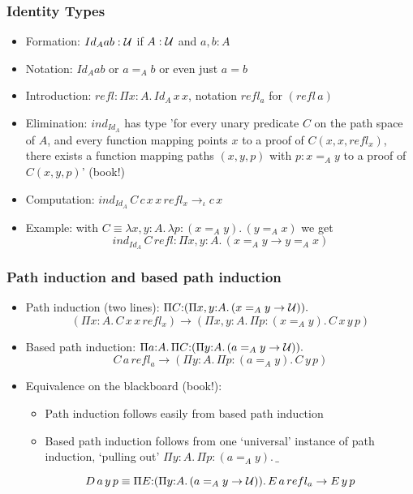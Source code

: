 \documentclass[handout]{beamer}
\newcommand{\depi}[3]{\Pi{#1{:}#2.\,#3}}
\newcommand{\lamt}[3]{\lambda{#1{:}#2.\,#3}}
\newcommand{\UU}{{\cal U}}
\begin{document}
\frame
  {
  
    \frametitle{Identity Types}

    \begin{itemize}[<+->]
    \item Formation: $Id_A a b:\UU$ if $A:\UU$ and $a,b:A$
    \item Notation: $Id_A a b$ or $a=_A b$ or even just $a=b$
    \item Introduction: $refl: \depi{x}{A}{Id_A\,x\,x}$, notation $refl_a$ for $(refl \,a)$
    \item Elimination: $ind_{Id_A}$ has type 'for every unary predicate $C$ on the path space of $A$,
and every function mapping points $x$ to a proof of $C(x,x,refl_x)$, there exists a function mapping paths
$(x,y,p)$ with $p:x=_A y$ to a proof of $C(x,y,p)$' (book!) 
    \item Computation: $ind_{Id_A}\,C\,c\,x\,x\,refl_x \to_\iota c\,x$
    \item Example: with $C\equiv\lamt{x,y}{A}{\lamt{p}{(x{=_A}y)}{(y =_A x)}}$ we get
$$ind_{Id_A}\,C\,refl: \depi{x,y}{A}{(x =_A y \to y =_A x)}$$ 
     
    \end{itemize}
  }

\frame
  {
  
    \frametitle{Path induction and based path induction}

    \begin{itemize}[<+->]
    \item Path induction (two lines): $\depi{C}{(\depi{x,y}{A}{(x =_A y \to \UU))}}{}$
\[{(\depi{x}{A}{C\,x\,x\,refl_x}) \to (\depi{x,y}{A}{\depi{p}{(x{=_A}y)}{C\,x\,y\,p}})}
\]
    \item Based path induction: $\depi{a}{A}{\depi{C}{(\depi{y}{A}{(a =_A y \to \UU))}}{}}$
\[{{C\,a\,refl_a} \to (\depi{y}{A}{\depi{p}{(a{=_A}y)}{C\,y\,p}})}
\]
    \item Equivalence on the blackboard (book!):
      \begin{itemize}[<+->]
      \item Path induction follows easily from based path induction
      \item Based path induction follows from one `universal' instance of path induction,
      `pulling out' $\depi{y}{A}{\depi{p}{(a{=_A}y)}{\_}}$
      \end{itemize}     
\[ D\,a\,y\,p \equiv \depi{E}{(\depi{y}{A}{(a=_A y \to \UU)})}{E\,a\,refl_a \to E\,y\,p}
\]
    \end{itemize}
  }
\end{document}

